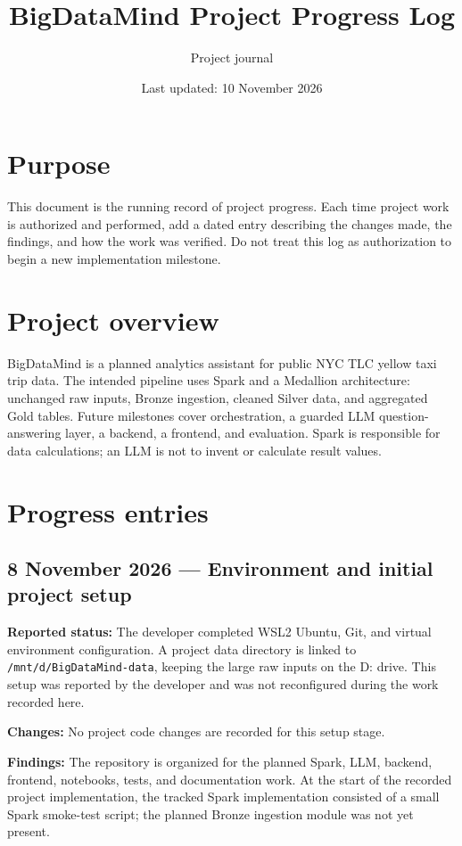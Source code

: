\documentclass[11pt,a4paper]{article}
\title{BigDataMind Project Progress Log}
\author{Project journal}
\date{Last updated: 10 November 2026}
\begin{document}
\maketitle

\section*{Purpose}
This document is the running record of project progress. Each time project work
is authorized and performed, add a dated entry describing the changes made,
the findings, and how the work was verified. Do not treat this log as
authorization to begin a new implementation milestone.

\section{Project overview}
BigDataMind is a planned analytics assistant for public NYC TLC yellow taxi
trip data. The intended pipeline uses Spark and a Medallion architecture:
unchanged raw inputs, Bronze ingestion, cleaned Silver data, and aggregated Gold
tables. Future milestones cover orchestration, a guarded LLM question-answering
layer, a backend, a frontend, and evaluation. Spark is responsible for data
calculations; an LLM is not to invent or calculate result values.

\section{Progress entries}

\subsection{8 November 2026 --- Environment and initial project setup}
\textbf{Reported status:} The developer completed WSL2 Ubuntu, Git, and virtual
environment configuration. A project data directory is linked to
\texttt{/mnt/d/BigDataMind-data}, keeping the large raw inputs on the D: drive.
This setup was reported by the developer and was not reconfigured during the
work recorded here.

\textbf{Changes:} No project code changes are recorded for this setup stage.

\textbf{Findings:} The repository is organized for the planned Spark, LLM,
backend, frontend, notebooks, tests, and documentation work. At the start of
the recorded project implementation, the tracked Spark implementation
consisted of a small Spark smoke-test script; the planned Bronze ingestion
module was not yet present.
\end{document}
